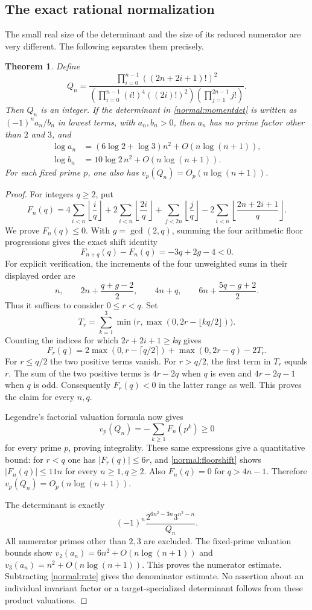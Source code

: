 \documentclass[11pt,a4paper]{article}
\numberwithin{equation}{section}
\newtheorem{theorem}{Theorem}[section]
\theoremstyle{definition}\newtheorem{definition}[theorem]{Definition}
\theoremstyle{remark}\newtheorem{remark}[theorem]{Remark}
\begin{document}
\subsection{The exact rational normalization}
The small real size of the determinant and the size of its reduced numerator are very different. The following separates them precisely.
\begin{theorem}\label{normal:arithmetic}
Define
\[
 Q_n=\frac{\prod_{i=0}^{n-1}((2n+2i+1)!)^2}
 {\left(\prod_{i=0}^{n-1}(i!)^4((2i)!)^2\right)
   \left(\prod_{j=1}^{2n-1}j!\right)}.
\]
Then $Q_n$ is an integer. If the determinant in \eqref{normal:momentdet} is written as $(-1)^n a_n/b_n$ in lowest terms, with $a_n,b_n>0$, then $a_n$ has no prime factor other than $2$ and $3$, and
\begin{align*}
 \log a_n&=(6\log2+\log3)n^2+O(n\log(n+1)),\\
 \log b_n&=10\log2\,n^2+O(n\log(n+1)).
\end{align*}
For each fixed prime $p$, one also has $v_p(Q_n)=O_p(n\log(n+1))$.
\end{theorem}
\begin{proof}
For integers $q\ge2$, put
\[
 F_n(q)=4\sum_{i<n}\left\lfloor\frac iq\right\rfloor
 +2\sum_{i<n}\left\lfloor\frac{2i}q\right\rfloor
 +\sum_{j<2n}\left\lfloor\frac jq\right\rfloor
 -2\sum_{i<n}\left\lfloor\frac{2n+2i+1}q\right\rfloor.
\]
We prove $F_n(q)\le0$. With $g=\gcd(2,q)$, summing the four arithmetic floor progressions gives the exact shift identity
\begin{equation}\label{normal:floorshift}
 F_{n+q}(q)-F_n(q)=-3q+2g-4<0.
\end{equation}
For explicit verification, the increments of the four unweighted sums in their displayed order are
\[
 n,\qquad 2n+\frac{q+g-2}{2},\qquad
 4n+q,\qquad 6n+\frac{5q-g+2}{2}.
\]
Thus it suffices to consider $0\le r<q$. Set
\[
 T_r=\sum_{k=1}^3\min\bigl(r,\max(0,2r-\lfloor kq/2\rfloor)\bigr).
\]
Counting the indices for which $2r+2i+1\ge kq$ gives
\[
 F_r(q)=2\max(0,r-\lceil q/2\rceil)+\max(0,2r-q)-2T_r.
\]
For $r\le q/2$ the two positive terms vanish. For $r>q/2$, the first term in $T_r$ equals $r$. The sum of the two positive terms is $4r-2q$ when $q$ is even and $4r-2q-1$ when $q$ is odd. Consequently $F_r(q)<0$ in the latter range as well. This proves the claim for every $n,q$.

Legendre's factorial valuation formula now gives
\[
 v_p(Q_n)=-\sum_{k\ge1}F_n(p^k)\ge0
\]
for every prime $p$, proving integrality. These same expressions give a quantitative bound: for $r<q$ one has $|F_r(q)|\le6r$, and \eqref{normal:floorshift} shows $|F_n(q)|\le11n$ for every $n\ge1,q\ge2$. Also $F_n(q)=0$ for $q>4n-1$. Therefore $v_p(Q_n)=O_p(n\log(n+1))$.

The determinant is exactly
\[
 (-1)^n\frac{2^{6n^2-3n}3^{n^2-n}}{Q_n}.
\]
All numerator primes other than $2,3$ are excluded. The fixed-prime valuation bounds show
$v_2(a_n)=6n^2+O(n\log(n+1))$ and
$v_3(a_n)=n^2+O(n\log(n+1))$.
This proves the numerator estimate. Subtracting \eqref{normal:rate} gives the denominator estimate. No assertion about an individual invariant factor or a target-specialized determinant follows from these product valuations.
\end{proof}
\end{document}
